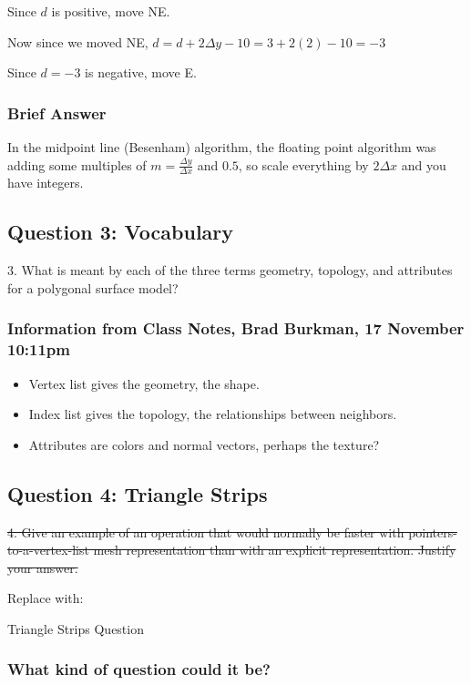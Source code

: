 \documentclass[11pt]{article}
\begin{document}
\begin{spacing}{1.2}
Since $d$ is positive, move NE.  

Now since we moved NE, $d = d+2 \Delta y - 10 = 3 + 2(2) - 10 = -3$

Since $d = -3$ is negative, move E.

\subsubsection{Brief Answer}

In the midpoint line (Besenham) algorithm, the floating point algorithm was adding some multiples of $m = \frac{\Delta y}{\Delta x}$ and $0.5$, so scale everything by $2\Delta x$ and you have integers.  

\subsection{Question 3:  Vocabulary}
3.  What is meant by each of the three terms geometry, topology, and attributes for a polygonal surface model?

\subsubsection{Information from Class Notes, Brad Burkman, 17 November 10:11pm}

\begin{itemize}
	\item Vertex list gives the geometry, the shape.  
	\item Index list gives the topology, the relationships between neighbors.  
	\item Attributes are colors and normal vectors, perhaps the texture?
\end{itemize}

\subsection{Question 4:  Triangle Strips}

\sout{4.  Give an example of an operation that would normally be faster with pointers-to-a-vertex-list mesh representation than with an explicit representation.  Justify your answer.  }

Replace with:

Triangle Strips Question

\subsubsection{What kind of question could it be?}


\end{spacing}
\end{document}
